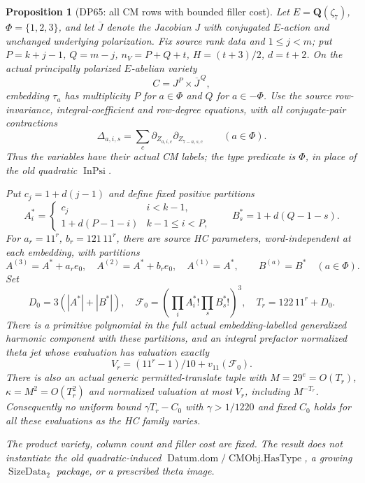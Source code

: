 \documentclass[11pt,a4paper]{article}
\newtheorem{proposition}[theorem]{Proposition}
\theoremstyle{definition}\newtheorem{remark}[theorem]{Remark}
\begin{document}
\begin{proposition}[DP65: all CM rows with bounded filler cost]\label{DP65}
Let $E=\mathbf Q(\zeta_7)$, $\Phi=\{1,2,3\}$, and let
$\overline J$ denote the Jacobian $J$ with conjugated $E$-action and
unchanged underlying polarization. Fix source rank data and $1\le j<m$;
put $P=k+j-1$, $Q=m-j$, $n_V=P+Q+t$, $H=(t+3)/2$, $d=t+2$.
On the actual principally polarized $E$-abelian variety
\[
 C=J^P\times\overline J^{\,Q},
\]
embedding $\tau_a$ has multiplicity $P$ for $a\in\Phi$ and $Q$ for
$a\in-\Phi$. Use the source row-invariance, integral-coefficient and
row-degree equations, with all conjugate-pair contractions
\[
 \Delta_{a,i,s}=\sum_c
 \partial_{Z_{a,i,c}}\partial_{Z_{7-a,s,c}}\qquad(a\in\Phi).
\]
Thus the variables have their actual CM labels; the type predicate is
$\Phi$, in place of the old quadratic $\operatorname{InPsi}$.

Put $c_j=1+d(j-1)$ and define fixed positive partitions
\[
 A_i^*=\begin{cases}c_j&i<k-1,\\1+d(P-1-i)&k-1\le i<P,\end{cases}
 \qquad B_s^*=1+d(Q-1-s).
\]
For $a_r=11^r$, $b_r=121\,11^r$, there are source HC parameters,
word-independent at each embedding, with partitions
\[
 A^{(3)}=A^*+a_re_0,\quad A^{(2)}=A^*+b_re_0,\quad
 A^{(1)}=A^*,\qquad B^{(a)}=B^*\quad(a\in\Phi).
\]
Set
\[
 D_0=3(|A^*|+|B^*|),\quad
 \mathcal F_0=\left(\prod_iA_i^*!\prod_sB_s^*!\right)^3,
 \quad T_r=122\,11^r+D_0.
\]
There is a primitive polynomial in the full actual embedding-labelled
generalized harmonic component with these partitions, and an integral
prefactor normalized theta jet whose evaluation has valuation exactly
\[
 V_r=(11^r-1)/10+v_{11}(\mathcal F_0).
\]
There is also an actual generic permitted-translate tuple with
$M=29^e=O(T_r)$, $\kappa=M^2=O(T_r^2)$ and normalized valuation at most
$V_r$, including $M^{-T_r}$. Consequently no uniform bound
$\gamma T_r-C_0$ with $\gamma>1/1220$ and fixed $C_0$ holds for all
these evaluations as the HC family varies.

The product variety, column count and filler cost are fixed. The result
does not instantiate the old quadratic-induced
$\operatorname{Datum.dom}/\operatorname{CMObj.HasType}$, a growing
$\operatorname{SizeData}_2$ package, or a prescribed theta image.
\end{proposition}
\end{document}
